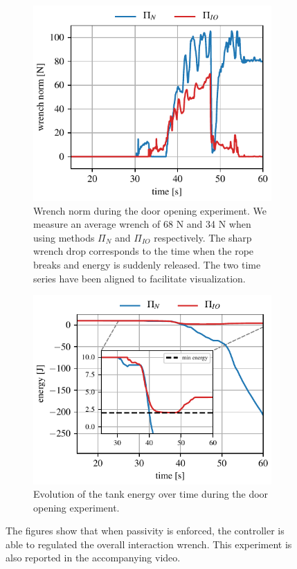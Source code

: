 \begin{figure}[t]
\centering
\hspace*{-0.0cm} 
\begin{subfigure}{0.9\columnwidth}
    \includegraphics[width=\linewidth]{figures/hardware_experiments/wrench_norm.pdf}
    \caption{Wrench norm during the door opening experiment. We measure an average wrench of 68 N and 34 N when using methods $\Pi_{N}$ and $\Pi_{IO}$ respectively. The sharp wrench drop corresponds to the time when the rope breaks and energy is suddenly released. The two time series have been aligned to facilitate visualization.}
\end{subfigure}
\hspace*{-0.2cm} 
\begin{subfigure}{0.9\columnwidth}
    \includegraphics[width=\linewidth]{figures/hardware_experiments/energy_tank.pdf}
    \caption{Evolution of the tank energy over time during the door opening experiment.}
\end{subfigure}
    \caption{The figures show that when passivity is enforced, the controller is able to regulated the overall interaction wrench. This experiment is also reported in the accompanying video.}
    \label{fig:passivity_experiment}
\end{figure}

